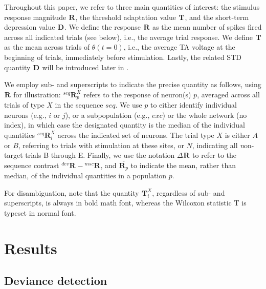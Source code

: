 \documentclass[9pt,lineno,onehalfspacing]{elife}
\newcommand{\R}[3][]{{}^{#1}_{}\boldsymbol R^{#2}_{#3}}
\newcommand{\T}[3][]{{}^{#1}_{}\boldsymbol T^{#2}_{#3}}
\newcommand{\D}[3][]{{}^{#1}_{}\boldsymbol D^{#2}_{#3}}
\newcommand{\mean}[1]{\overline{#1}}
\begin{document}
Throughout this paper, we refer to three main quantities of interest: the stimulus response magnitude $\R{}{}$, the threshold adaptation value $\T{}{}$, and the short-term depression value $\D{}{}$. We define the response $\R{}{}$ as the mean number of spikes fired across all indicated trials (see below), i.e., the average trial response. We define $\T{}{}$ as the mean across trials of $\theta(t=0)$, i.e., the average TA voltage at the beginning of trials, immediately before stimulation. Lastly, the related STD quantity $\D{}{}$ will be introduced later in .

We employ sub- and superscripts to indicate the precise quantity as follows, using $\R{}{}$ for illustration: $\R[seq]{X}{p}$ refers to the response of neuron(s) $p$, averaged across all trials of type $X$ in the sequence $seq$. We use $p$ to either identify individual neurons (e.g., $i$ or $j$), or a subpopulation (e.g., $exc$) or the whole network (no index), in which case the designated quantity is the median of the individual quantities $\R[seq]{X}{i}$ across the indicated set of neurons. The trial type $X$ is either $A$ or $B$, referring to trials with stimulation at these sites, or $N$, indicating all \textit{n}on-target trials B through E. Finally, we use the notation $\Delta \R{}{}$ to refer to the sequence contrast $\R[dev]{}{} - \R[msc]{}{}$, and $\mean{\R{}{p}}$ to indicate the mean, rather than median, of the individual quantities in a population $p$.

For disambiguation, note that the quantity $\T{X}{i}$, regardless of sub- and superscripts, is always in bold math font, whereas the Wilcoxon statistic T is typeset in normal font.

\section{Results}\label{sec:results}

\subsection{Deviance detection}\label{sec:dd}
\end{document}
